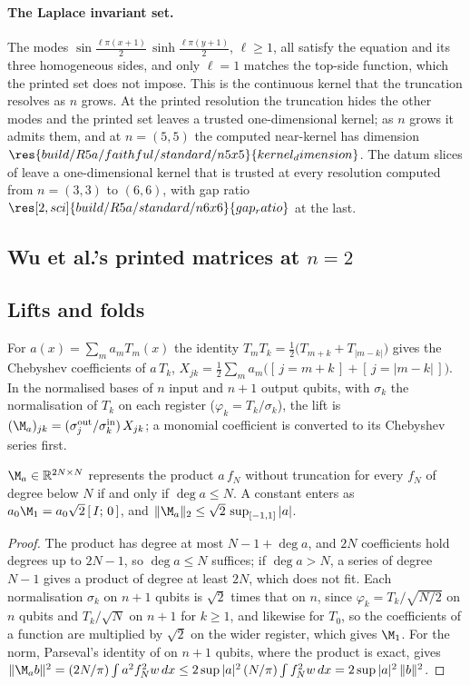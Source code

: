 \paragraph{The Laplace invariant set.} The modes $\sin\tfrac{\ell\pi(x+1)}{2}\,\sinh\tfrac{\ell\pi(y+1)}{2}$, $\ell\ge1$, all satisfy the equation and its three homogeneous sides, and only $\ell=1$ matches the top-side function, which the printed set does not impose. This is the continuous kernel that the truncation resolves as $n$ grows. At the printed resolution the truncation hides the other modes and the printed set leaves a trusted one-dimensional kernel; as $n$ grows it admits them, and at $n=(5,5)$ the computed near-kernel has dimension $\res{build/R5a/faithful/standard/n5x5}{kernel_dimension}$. The datum slices of  leave a one-dimensional kernel that is trusted at every resolution computed from $n=(3,3)$ to $(6,6)$, with gap ratio $\res[2,sci]{build/R5a/standard/n6x6}{gap_ratio}$ at the last.

\subsection{Wu et al.'s printed matrices at \texorpdfstring{$n = 2$}{n = 2}}
\label{app:sm-matrices}

\subsection{Lifts and folds}
\label{app:lifts-folds}

For $a(x)=\sum_ma_mT_m(x)$ the identity $T_mT_k=\tfrac12\bigl(T_{m+k}+T_{|m-k|}\bigr)$ gives the Chebyshev coefficients of $a\,T_k$, $X_{jk}=\tfrac12\sum_ma_m\bigl([\,j=m+k\,]+[\,j=|m-k|\,]\bigr)$. In the normalised bases of $n$ input and $n+1$ output qubits, with $\sigma_k$ the normalisation of $T_k$ on each register ($\varphi_k=T_k/\sigma_k$), the lift is $(\M_a)_{jk}=(\sigma^{\mathrm{out}}_j/\sigma^{\mathrm{in}}_k)\,X_{jk}$; a monomial coefficient is converted to its Chebyshev series first.

\begin{proposition}
\label{prop:lift}
$\M_a\in\mathbb R^{2N\times N}$ represents the product $a\,f_N$ without truncation for every $f_N$ of degree below $N$ if and only if $\deg a\le N$. A constant enters as $a_0\M_1=a_0\sqrt2\,[\,I;\,0\,]$, and $\|\M_a\|_2\le\sqrt2\,\sup_{[-1,1]}|a|$.
\end{proposition}
\begin{proof}
The product has degree at most $N-1+\deg a$, and $2N$ coefficients hold degrees up to $2N-1$, so $\deg a\le N$ suffices; if $\deg a>N$, a series of degree $N-1$ gives a product of degree at least $2N$, which does not fit. Each normalisation $\sigma_k$ on $n+1$ qubits is $\sqrt2$ times that on $n$, since $\varphi_k=T_k/\sqrt{N/2}$ on $n$ qubits and $T_k/\sqrt N$ on $n+1$ for $k\ge1$, and likewise for $T_0$, so the coefficients of a function are multiplied by $\sqrt2$ on the wider register, which gives $\M_1$. For the norm, Parseval's identity of  on $n+1$ qubits, where the product is exact, gives $\|\M_ab\|^2=(2N/\pi)\int a^2f_N^2w\,dx\le2\sup|a|^2\,(N/\pi)\int f_N^2w\,dx=2\sup|a|^2\,\|b\|^2$.
\end{proof}

